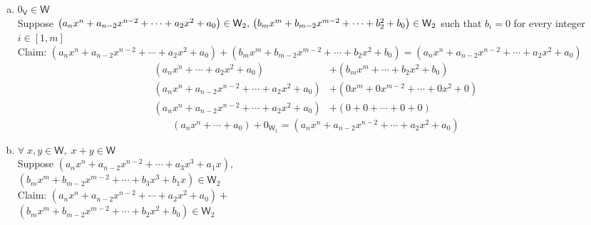 \documentclass[letterpaper,12pt]{article}
\newcommand{\tab}{\hspace*{1.5em}}
\newcommand{\?}{\stackrel{?}{=}}
\begin{document}
\begin{spacing}{1.5}
\begin{enumerate}
\begin{enumerate}[(a)]
\item $0_\mathsf{V} \in \mathsf{W}$
\\
Suppose $\left(a_nx^n + a_{n-2}x^{n-2}+\cdots+ a_2x^2 + a_0\right) \in
\mathsf{W}_2,\\ \left(b_mx^m + b_{m-2}x^{m-2}+\cdots+ b_2^2 + b_0\right) \in
\mathsf{W}_2$ such that $b_i = 0$ for every integer
$i\in\left[1,m\right]$
\\
Claim: $\left(a_nx^n + a_{n-2}x^{n-2}+\cdots+ a_2x^2 + a_0\right) +
\left(b_mx^m + b_{m-2}x^{m-2}+\cdots+ b_2x^2 + b_0\right) =
\left(a_nx^n + a_{n-2}x^{n-2}+\cdots+ a_2x^2 + a_0\right)$
\begin{align}
\left(a_nx^n +\cdots+ a_2x^2 + a_0\right) &+
\left(b_mx^m +\cdots+ b_2x^2 + b_0\right)\\
\left(a_nx^n + a_{n-2}x^{n-2}+\cdots+ a_2x^2 + a_0\right) &+ \left(0x^m
  + 0x^{m-2}+\cdots+ 0x^2 + 0\right)\\
\left(a_nx^n + a_{n-2}x^{n-2}+\cdots+ a_2x^2 + a_0\right) &+ \left(0
  + 0 +\cdots+ 0 + 0\right)
\end{align}
\begin{equation}
\left(a_nx^n +\cdots+ a_0\right) +
0_{\mathsf{W}_1} = \left(a_nx^n + a_{n-2}x^{n-2}+\cdots+ a_2x^2 + a_0\right)
\end{equation}

\item $ \forall\; x,y \in \mathsf{W},\; x + y \in \mathsf{W}$
\\
Suppose $\left(a_nx^n + a_{n-2}x^{n-2}+\cdots+ a_3x^3 + a_1x\right),$ \\
\tab \tab \tab $\left(b_mx^m + b_{m-2}x^{m-2}+\cdots+ b_3x^3 + b_1x\right) \in
\mathsf{W}_2$
\\
Claim: $\left(a_nx^n + a_{n-2}x^{n-2}+\cdots+ a_2x^2 + a_0\right) +$
\\ \tab \tab \tab $\left(b_mx^m + b_{m-2}x^{m-2}+\cdots+ b_2x^2 +
  b_0\right) \in \mathsf{W}_2$

\end{enumerate}
\end{enumerate}
\end{spacing}
\end{document}
